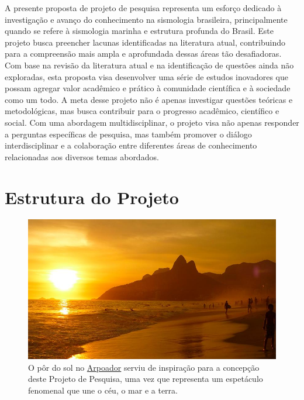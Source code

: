 \documentclass[10pt,a4paper,oneside]{book}
\newcommand{\HeroFigPad}{\vspace{-1cm}}
\begin{document}
\bigskip	

A presente proposta de projeto de pesquisa representa um esforço dedicado à investigação e avanço do conhecimento na sismologia brasileira, principalmente quando se refere à sismologia marinha e estrutura profunda do Brasil. Este projeto busca preencher lacunas identificadas na literatura atual, contribuindo para a compreensão mais ampla e aprofundada dessas áreas tão desafiadoras. Com base na revisão da literatura atual e na identificação de questões ainda não exploradas, esta proposta visa desenvolver uma série de estudos inovadores que possam agregar valor acadêmico e prático à comunidade científica e à sociedade como um todo. A meta desse projeto não é apenas investigar questões teóricas e metodológicas, mas busca contribuir para o progresso acadêmico, científico e social. Com uma abordagem multidisciplinar, o projeto visa não apenas responder a perguntas específicas de pesquisa, mas também promover o diálogo interdisciplinar e a colaboração entre diferentes áreas de conhecimento relacionadas aos diversos temas abordados.

\chapter{Estrutura do Projeto}
\label{cap_estrutura}

\begin{figure}[h]
	\HeroFigPad
	\begin{center}
		\includegraphics[scale=0.52]{images/arpoador.jpg}
	\end{center}
	\caption{
	O pôr do sol no \href{https://pt.wikipedia.org/wiki/Arpoador}{Arpoador} serviu de inspiração para a concepção deste Projeto de Pesquisa, uma vez que representa um espetáculo fenomenal que une o céu, o mar e a terra.
    }
 \label{fig_arpoador}
\end{figure}
\end{document}
